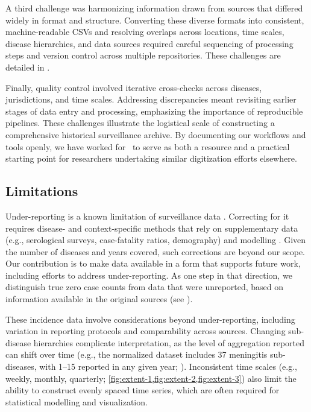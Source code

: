 \documentclass[12pt]{article}
\begin{document}
A third challenge was harmonizing information drawn from sources that differed widely in format and structure. Converting these diverse formats into consistent, machine-readable CSVs and resolving overlaps across locations, time scales, disease hierarchies, and data sources required careful sequencing of processing steps and version control across multiple repositories. These challenges are detailed in .

Finally, quality control involved iterative cross-checks across diseases, jurisdictions, and time scales. Addressing discrepancies meant revisiting earlier stages of data entry and processing, emphasizing the importance of reproducible pipelines. These challenges illustrate the logistical scale of constructing a comprehensive historical surveillance archive. By documenting our workflows and tools openly, we have worked for \datacronym\ to serve as both a resource and a practical starting point for researchers undertaking similar digitization efforts elsewhere.

\subsection{Limitations}\label{sec:limitations}

Under-reporting is a known limitation of surveillance data \cite{van2013contagious,gibbons2014measuring}. Correcting for it requires disease- and context-specific methods that rely on supplementary data (e.g., serological surveys, case-fatality ratios, demography) and modelling \cite{mangen2011current}. Given the number of diseases and years covered, such corrections are beyond our scope. Our contribution is to make data available in a form that supports future work, including efforts to address under-reporting. As one step in that direction, we distinguish true zero case counts from data that were unreported, based on information available in the original sources (see ).

These incidence data involve considerations beyond under-reporting, including variation in reporting protocols and comparability across sources. Changing sub-disease hierarchies complicate interpretation, as the level of aggregation reported can shift over time (e.g., the normalized dataset includes 37 meningitis sub-diseases, with 1--15 reported in any given year; ). Inconsistent time scales (e.g., weekly, monthly, quarterly; \cref{fig:extent-1,fig:extent-2,fig:extent-3}) also limit the ability to construct evenly spaced time series, which are often required for statistical modelling and visualization.
\end{document}
